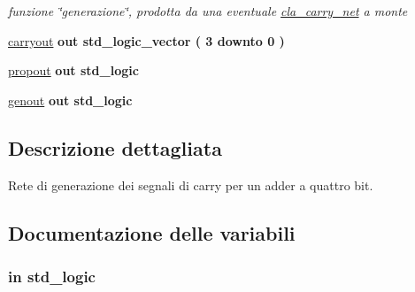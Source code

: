 \begin{DoxyCompactItemize}
\begin{DoxyCompactList}\small\item\em funzione \char`\"{}generazione\char`\"{}, prodotta da una eventuale \hyperlink{classcla__carry__net}{cla\+\_\+carry\+\_\+net} a monte \end{DoxyCompactList}\item 
\hyperlink{group___carry_network_ga6b265f3fe41195485dfedd9824c3598f}{carryout}  {\bfseries {\bfseries \textcolor{vhdlchar}{out}\textcolor{vhdlchar}{ }}} {\bfseries \textcolor{vhdlchar}{std\+\_\+logic\+\_\+vector}\textcolor{vhdlchar}{ }\textcolor{vhdlchar}{(}\textcolor{vhdlchar}{ }\textcolor{vhdlchar}{ } \textcolor{vhdldigit}{3} \textcolor{vhdlchar}{ }\textcolor{vhdlchar}{downto}\textcolor{vhdlchar}{ }\textcolor{vhdlchar}{ } \textcolor{vhdldigit}{0} \textcolor{vhdlchar}{ }\textcolor{vhdlchar}{)}\textcolor{vhdlchar}{ }} 
\item 
\hyperlink{group___carry_network_ga5957c9cdd706cafd2da8855133a002c9}{propout}  {\bfseries {\bfseries \textcolor{vhdlchar}{out}\textcolor{vhdlchar}{ }}} {\bfseries \textcolor{vhdlchar}{std\+\_\+logic}\textcolor{vhdlchar}{ }} 
\item 
\hyperlink{group___carry_network_ga068cd5c4d23e284cb942702252ed1491}{genout}  {\bfseries {\bfseries \textcolor{vhdlchar}{out}\textcolor{vhdlchar}{ }}} {\bfseries \textcolor{vhdlchar}{std\+\_\+logic}\textcolor{vhdlchar}{ }} 
\end{DoxyCompactItemize}


\subsection{Descrizione dettagliata}
Rete di generazione dei segnali di carry per un adder a quattro bit. 



\subsection{Documentazione delle variabili}
\subsubsection[{\texorpdfstring{carryin}{carryin}}]{ {\bfseries \textcolor{vhdlchar}{in}\textcolor{vhdlchar}{ }} {\bfseries \textcolor{vhdlchar}{std\+\_\+logic}\textcolor{vhdlchar}{ }} \hspace{0.3cm}{\ttfamily [Port]}}\hypertarget{group___carry_network_gaa556a73dc4a4de1a0d662b25adbcbe33}{}\label{group___carry_network_gaa556a73dc4a4de1a0d662b25adbcbe33}


